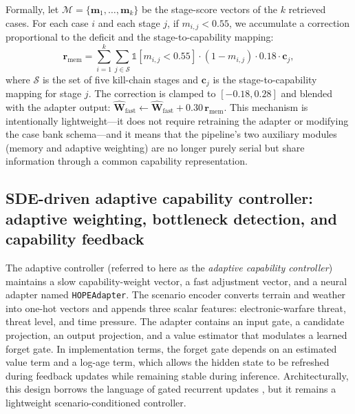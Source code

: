Formally, let $\mathcal{M} = \{\mathbf{m}_1, \ldots, \mathbf{m}_k\}$ be the stage-score vectors of the $k$ retrieved cases. For each case $i$ and each stage $j$, if $m_{i,j} < 0.55$, we accumulate a correction proportional to the deficit and the stage-to-capability mapping:
\[
\mathbf{r}_{\text{mem}} = \sum_{i=1}^{k} \sum_{j \in \mathcal{S}} \mathbb{1}[m_{i,j} < 0.55] \cdot (1 - m_{i,j}) \cdot 0.18 \cdot \mathbf{c}_j,
\]
where $\mathcal{S}$ is the set of five kill-chain stages and $\mathbf{c}_j$ is the stage-to-capability mapping for stage $j$. The correction is clamped to $[-0.18, 0.28]$ and blended with the adapter output: $\hat{\mathbf{W}}_{\text{fast}} \leftarrow \hat{\mathbf{W}}_{\text{fast}} + 0.30\,\mathbf{r}_{\text{mem}}$. This mechanism is intentionally lightweight---it does not require retraining the adapter or modifying the case bank schema---and it means that the pipeline's two auxiliary modules (memory and adaptive weighting) are no longer purely serial but share information through a common capability representation.

\subsection{SDE-driven adaptive capability controller: adaptive weighting, bottleneck detection, and capability feedback}

The adaptive controller (referred to here as the \emph{adaptive capability controller}) maintains a slow capability-weight vector, a fast adjustment vector, and a neural adapter named \texttt{HOPEAdapter}. The scenario encoder converts terrain and weather into one-hot vectors and appends three scalar features: electronic-warfare threat, threat level, and time pressure. The adapter contains an input gate, a candidate projection, an output projection, and a value estimator that modulates a learned forget gate. In implementation terms, the forget gate depends on an estimated value term and a log-age term, which allows the hidden state to be refreshed during feedback updates while remaining stable during inference. Architecturally, this design borrows the language of gated recurrent updates \citep{hochreiter1997lstm}, but it remains a lightweight scenario-conditioned controller.

